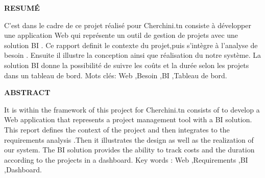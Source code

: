 \newpage
\bigskip

\textbf{RESUM\'E}

\bigskip
\newline

C'est dans le cadre de ce projet  r\'{e}alis\'{e} pour Cherchini.tn consiste \`{a} d\'{e}velopper une application Web qui repr\'{e}sente un
outil de gestion de projets avec une solution BI .
Ce rapport definit le contexte du projet,puis s'int\`{e}gre \`{a} l'analyse de besoin
. Ensuite il illustre la conception ainsi que r\'{e}alisation du notre syst\`{e}me.
La solution BI donne la possibilité de suivre les coûts et la durée selon les  projets dans un tableau de bord.
\newline
\bigskip
Mots cl\'{e}s: Web ,Besoin ,BI ,Tableau de bord.



\bigskip
\bigskip
\bigskip

\textbf{ABSTRACT}


\bigskip
\newline

It is within the framework of this project for Cherchini.tn consists of
to develop a Web application that represents a project management tool
with a BI solution. This report defines the context of the project and then integrates
to the requirements analysis .Then it illustrates the design as well as the realization
of our system. The BI solution provides the ability to track costs and
the duration according to the projects in a dashboard.
\newline
\bigskip
Key words : Web ,Requirements ,BI ,Dashboard. 
